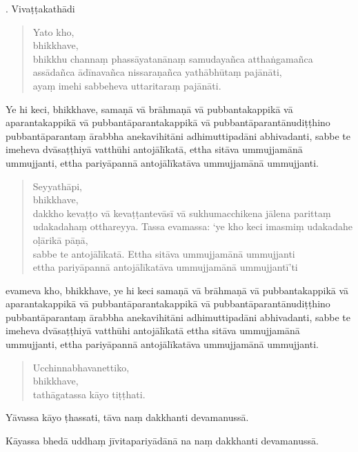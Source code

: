 \documentclass[11pt,twoside,openright]{book}
\begin{document}
. Vivaṭṭakathādi
\pend

\begin{verse}
Yato kho,\\
\vin  bhikkhave,\\
\vin  bhikkhu channaṃ phassāyatanānaṃ samudayañca atthaṅgamañca assādañca ādīnavañca nissaraṇañca yathābhūtaṃ pajānāti,\\
\vin  ayaṃ imehi sabbeheva uttaritaraṃ pajānāti.

\end{verse}
\pstart
Ye hi keci, bhikkhave, samaṇā vā brāhmaṇā vā pubbantakappikā vā aparantakappikā vā pubbantāparantakappikā vā pubbantāparantānudiṭṭhino pubbantāparantaṃ ārabbha anekavihitāni adhimuttipadāni abhivadanti, sabbe te imeheva dvāsaṭṭhiyā vatthūhi antojālīkatā, ettha sitāva ummujjamānā ummujjanti, ettha pariyāpannā antojālīkatāva ummujjamānā ummujjanti.
\pend

\begin{verse}
Seyyathāpi,\\
\vin  bhikkhave,\\
\vin  dakkho kevaṭṭo vā kevaṭṭantevāsī vā sukhumacchikena jālena parittaṃ udakadahaṃ otthareyya. Tassa evamassa: ‘ye kho keci imasmiṃ udakadahe oḷārikā pāṇā,\\
\vin  sabbe te antojālīkatā. Ettha sitāva ummujjamānā ummujjanti\\
 ettha pariyāpannā antojālīkatāva ummujjamānā ummujjantī’ti\\


\end{verse}
\pstart
evameva kho, bhikkhave, ye hi keci samaṇā vā brāhmaṇā vā pubbantakappikā vā aparantakappikā vā pubbantāparantakappikā vā pubbantāparantānudiṭṭhino pubbantāparantaṃ ārabbha anekavihitāni adhimuttipadāni abhivadanti, sabbe te imeheva dvāsaṭṭhiyā vatthūhi antojālīkatā ettha sitāva ummujjamānā ummujjanti, ettha pariyāpannā antojālīkatāva ummujjamānā ummujjanti.
\pend

\begin{verse}
Ucchinnabhavanettiko,\\
\vin  bhikkhave,\\
\vin  tathāgatassa kāyo tiṭṭhati.

\end{verse}
\pstart
Yāvassa kāyo ṭhassati, tāva naṃ dakkhanti devamanussā.
\pend

\pstart
Kāyassa bhedā uddhaṃ jīvitapariyādānā na naṃ dakkhanti devamanussā.
\pend
\end{document}
